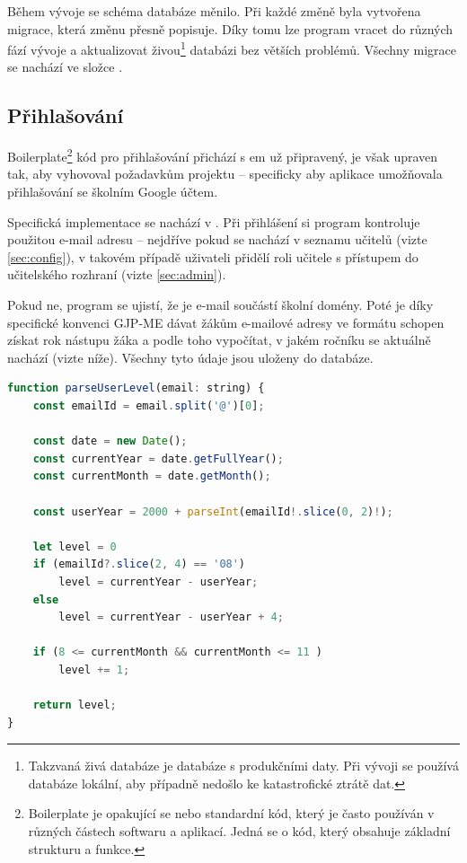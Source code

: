 Během vývoje se schéma databáze měnilo. Při každé změně byla vytvořena migrace, která změnu přesně popisuje. Díky tomu lze program vracet do různých fází vývoje a aktualizovat živou\footnote{Takzvaná živá databáze je databáze s produkčními daty. Při vývoji se používá databáze lokální, aby případně nedošlo ke katastrofické ztrátě dat.} databázi bez větších problémů. Všechny migrace se nachází ve složce .

\subsection{Přihlašování}
\label{sec:login}

Boilerplate\footnote{Boilerplate je opakující se nebo standardní kód, který je často používán v různých částech softwaru a aplikací. Jedná se o kód, který obsahuje základní strukturu a funkce.} kód pro přihlašování přichází s em už připravený, je však upraven tak, aby vyhovoval požadavkům projektu -- specificky aby aplikace umožňovala přihlašování se školním Google účtem.

Specifická implementace se nachází v . Při přihlášení si program kontroluje použitou e-mail adresu -- nejdříve pokud se nachází v seznamu učitelů (vizte \ref{sec:config}), v takovém případě uživateli přidělí roli učitele s přístupem do učitelského rozhraní (vizte \ref{sec:admin}). 

Pokud ne, program se ujistí, že je e-mail součástí školní domény. Poté je díky specifické konvenci GJP-ME dávat žákům e-mailové adresy ve formátu  schopen získat rok nástupu žáka a podle toho vypočítat, v jakém ročníku se aktuálně nachází (vizte níže). Všechny tyto údaje jsou uloženy do databáze.

\begin{lstlisting}[language=JavaScript,caption={Zjištění aktuálního ročníku uživatele}]
function parseUserLevel(email: string) {
    const emailId = email.split('@')[0];
    
    const date = new Date();
    const currentYear = date.getFullYear();
    const currentMonth = date.getMonth();
    
    const userYear = 2000 + parseInt(emailId!.slice(0, 2)!);
    
    let level = 0
    if (emailId?.slice(2, 4) == '08')
        level = currentYear - userYear;
    else
        level = currentYear - userYear + 4;
    
    if (8 <= currentMonth && currentMonth <= 11 )
        level += 1;
    
    return level;
}
\end{lstlisting}

